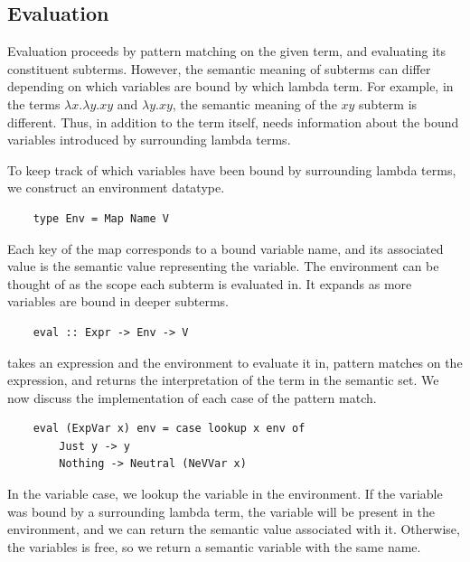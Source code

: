 
\subsection{Evaluation}

Evaluation proceeds by pattern matching on the given term, and evaluating its constituent subterms. However, the semantic meaning of subterms can differ depending on which variables are bound by which lambda term. For example, in the terms $\lambda x . \lambda y . xy$ and $\lambda y . xy$, the semantic meaning of the $xy$ subterm is different. Thus, in addition to the term itself,  needs information about the bound variables introduced by surrounding lambda terms. 

To keep track of which variables have been bound by surrounding lambda terms, we construct an environment datatype.

\begin{lstlisting}
    type Env = Map Name V
\end{lstlisting}

Each key of the map corresponds to a bound variable name, and its associated value is the semantic value representing the variable. The environment can be thought of as the scope each subterm is evaluated in. 
It expands as more variables are bound in deeper subterms.

\begin{lstlisting}
    eval :: Expr -> Env -> V
\end{lstlisting}

 takes an expression and the environment to evaluate it in, pattern matches on the expression, and returns the interpretation of the term in the semantic set. We now discuss the implementation of each case of the pattern match.

\begin{lstlisting}
    eval (ExpVar x) env = case lookup x env of
        Just y -> y
        Nothing -> Neutral (NeVVar x)
\end{lstlisting}

In the variable case, we lookup the variable in the environment. If the variable was bound by a surrounding lambda term, the variable will be present in the environment, and we can return the semantic value associated with it. Otherwise, the variables is free, so we return a semantic variable with the same name.

